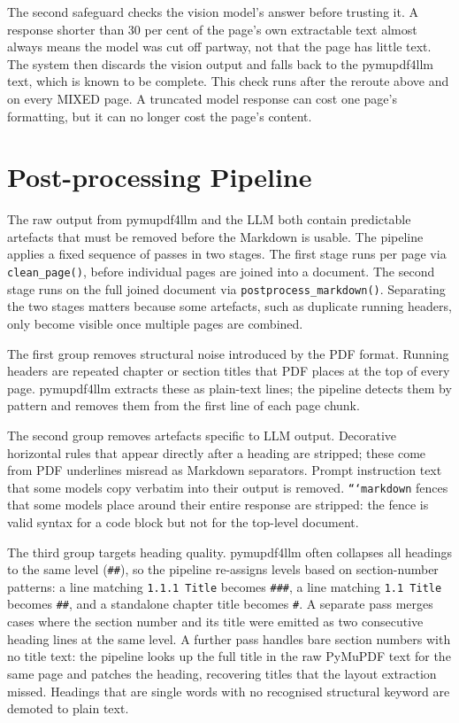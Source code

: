 The second safeguard checks the vision model's answer before trusting it.
A response shorter than 30 per cent of the page's own extractable text almost always means the model was cut off partway, not that the page has little text.
The system then discards the vision output and falls back to the pymupdf4llm text, which is known to be complete.
This check runs after the reroute above and on every MIXED page.
A truncated model response can cost one page's formatting, but it can no longer cost the page's content.

\section{Post-processing Pipeline}
\label{sec:postprocessing_pipeline}

The raw output from pymupdf4llm and the LLM both contain predictable artefacts that must be removed before the Markdown is usable.
The pipeline applies a fixed sequence of passes in two stages.
The first stage runs per page via \texttt{clean\_page()}, before individual pages are joined into a document.
The second stage runs on the full joined document via \texttt{postprocess\_markdown()}.
Separating the two stages matters because some artefacts, such as duplicate running headers, only become visible once multiple pages are combined.

The first group removes structural noise introduced by the PDF format.
Running headers are repeated chapter or section titles that PDF places at the top of every page.
pymupdf4llm extracts these as plain-text lines; the pipeline detects them by pattern and removes them from the first line of each page chunk.

The second group removes artefacts specific to LLM output.
Decorative horizontal rules that appear directly after a heading are stripped; these come from PDF underlines misread as Markdown separators.
Prompt instruction text that some models copy verbatim into their output is removed.
\texttt{```markdown} fences that some models place around their entire response are stripped: the fence is valid syntax for a code block but not for the top-level document.

The third group targets heading quality.
pymupdf4llm often collapses all headings to the same level (\texttt{\#\#}), so the pipeline re-assigns levels based on section-number patterns: a line matching \texttt{1.1.1 Title} becomes \texttt{\#\#\#}, a line matching \texttt{1.1 Title} becomes \texttt{\#\#}, and a standalone chapter title becomes \texttt{\#}.
A separate pass merges cases where the section number and its title were emitted as two consecutive heading lines at the same level.
A further pass handles bare section numbers with no title text: the pipeline looks up the full title in the raw PyMuPDF text for the same page and patches the heading, recovering titles that the layout extraction missed.
Headings that are single words with no recognised structural keyword are demoted to plain text.

